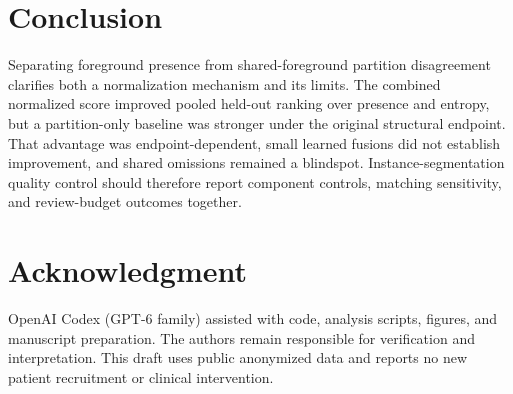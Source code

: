 \documentclass[conference]{IEEEtran}
\begin{document}
\section{Conclusion}
Separating foreground presence from shared-foreground partition disagreement clarifies both a normalization mechanism and its limits. The combined normalized score improved pooled held-out ranking over presence and entropy, but a partition-only baseline was stronger under the original structural endpoint. That advantage was endpoint-dependent, small learned fusions did not establish improvement, and shared omissions remained a blindspot. Instance-segmentation quality control should therefore report component controls, matching sensitivity, and review-budget outcomes together.

\clearpage
\section*{Acknowledgment}
OpenAI Codex (GPT-6 family) assisted with code, analysis scripts, figures, and manuscript preparation. The authors remain responsible for verification and interpretation. This draft uses public anonymized data and reports no new patient recruitment or clinical intervention.



\end{document}
